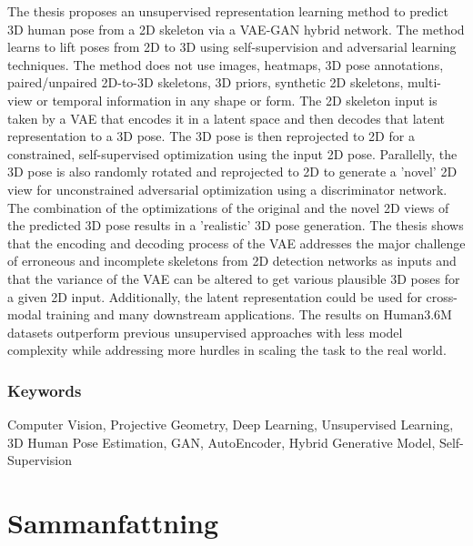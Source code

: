 The thesis proposes an unsupervised representation learning method to predict 3D human pose from a 2D skeleton via a VAE-GAN hybrid network. The method learns to lift poses from 2D to 3D using self-supervision and adversarial learning techniques. The method does not use images, heatmaps, 3D pose annotations, paired/unpaired 2D-to-3D skeletons, 3D priors, synthetic 2D skeletons, multi-view or temporal information in any shape or form. The 2D skeleton input is taken by a VAE that encodes it in a latent space and then decodes that latent representation to a 3D pose. The 3D pose is then reprojected to 2D for a constrained, self-supervised optimization using the input 2D pose. Parallelly, the 3D pose is also randomly rotated and reprojected to 2D to generate a 'novel' 2D view for unconstrained adversarial optimization using a discriminator network. The combination of the optimizations of the original and the novel 2D views of the predicted 3D pose results in a 'realistic' 3D pose generation. The thesis shows that the encoding and decoding process of the VAE addresses the major challenge of erroneous and incomplete skeletons from 2D detection networks as inputs and that the variance of the VAE can be altered to get various plausible 3D poses for a given 2D input. Additionally, the latent representation could be used for cross-modal training and many downstream applications. The results on Human3.6M datasets outperform previous unsupervised approaches with less model complexity while addressing more hurdles in scaling the task to the real world.


\subsection*{Keywords}
Computer Vision, Projective Geometry, Deep Learning, Unsupervised Learning, 3D Human Pose Estimation, GAN, AutoEncoder, Hybrid Generative Model, Self-Supervision

\newpage
\thispagestyle{plain}
\chapter*{Sammanfattning} 

